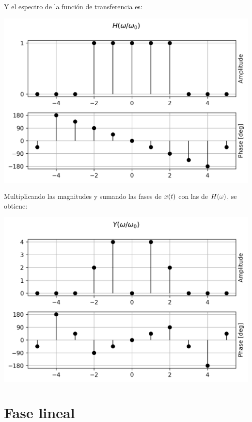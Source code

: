 \begin{mdframed}[style=ExampleFrame]
    Y el espectro de la función de transferencia es:
    \begin{center}
        \includegraphics[width=\linewidth]{./images/ej_siemtria_hermitiana_h.png}
    \end{center}

    Multiplicando las magnitudes y sumando las fases de $\fx[x]{t}$ con las de $\fx[H]{\omega}$, se obtiene:
    \begin{center}
        \includegraphics[width=\linewidth]{./images/ej_siemtria_hermitiana_y.png}
    \end{center}
\end{mdframed}

\section{Fase lineal}

